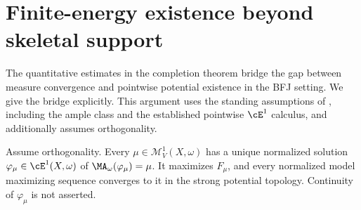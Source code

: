 \section{Finite-energy existence beyond skeletal support}
\label{sec:ch28-general-finite-energy-existence}

The quantitative estimates in the completion theorem bridge the gap
between measure convergence and pointwise potential existence in the
BFJ setting.  We give the bridge explicitly.  This argument uses the
standing assumptions of , including the ample
class and the established pointwise $\cE^1$ calculus, and additionally
assumes orthogonality.

\begin{theorem}
\label{thm:ch28-finite-energy-existence}
Assume orthogonality.  Every
$\mu\in\mathcal M^1_V(X,\omega)$ has a unique normalized solution
$\varphi_\mu\in\cE^1(X,\omega)$ of
$\MA_\omega(\varphi_\mu)=\mu$.  It maximizes $F_\mu$, and every
normalized model maximizing sequence converges to it in the strong
potential topology.  Continuity of $\varphi_\mu$ is not asserted.
\end{theorem}

